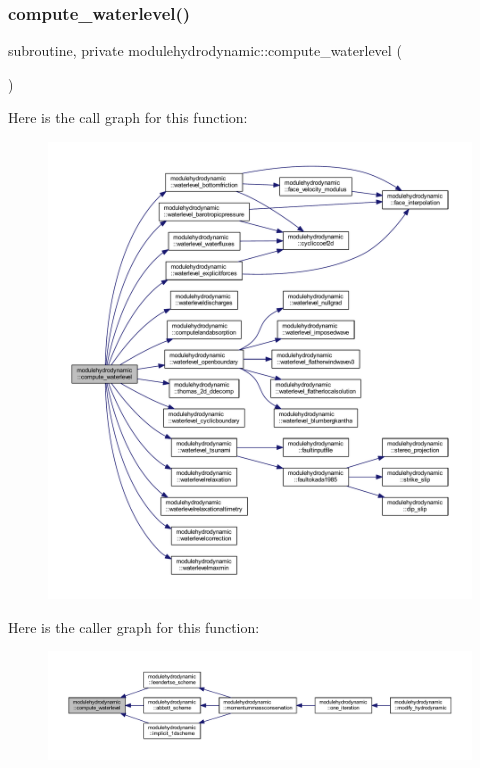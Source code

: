 \subsubsection{\texorpdfstring{compute\+\_\+waterlevel()}{compute\_waterlevel()}}
{\footnotesize\ttfamily subroutine, private modulehydrodynamic\+::compute\+\_\+waterlevel (\begin{DoxyParamCaption}{ }\end{DoxyParamCaption})\hspace{0.3cm}{\ttfamily [private]}}

Here is the call graph for this function\+:\nopagebreak
\begin{figure}[H]
\begin{center}
\leavevmode
\includegraphics[width=350pt]{namespacemodulehydrodynamic_abe745b3932a59db4111fe2798a0c335d_cgraph}
\end{center}
\end{figure}
Here is the caller graph for this function\+:\nopagebreak
\begin{figure}[H]
\begin{center}
\leavevmode
\includegraphics[width=350pt]{namespacemodulehydrodynamic_abe745b3932a59db4111fe2798a0c335d_icgraph}
\end{center}
\end{figure}
\mbox{\label{namespacemodulehydrodynamic_a0b29794a32cb2b809209708245963c8c}} 
